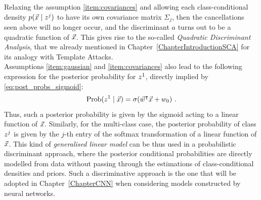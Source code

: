 Relaxing the assumption \ref{item:covariances} and allowing each class-conditional density $p(\vec{x}\mid z^j)$ to have its own covariance matrix $\Sigma_j$, then the cancellations seen above will no longer occur, and the discriminant $a$ turns out to be a quadratic function of $\vec{x}$. This gives rise to the so-called \emph{Quadratic Discriminant Analysis}, that we already mentioned in Chapter~\ref{ChapterIntroductionSCA} for its analogy with Template Attacks.\\

Assumptions \ref{item:gaussian} and \ref{item:covariances} also lead to the following expression for the posterior probability for $z^1$, directly implied by \eqref{eq:post_probs_sigmoid}: 
\begin{equation}
\prob(\given{\sensVar^1}{\vLeakVec}) = \sigma(\www^\intercal \vLeakVec + w_0)\mbox{ .}
\end{equation}
Thus, such a posterior probability is given by the sigmoid acting to a linear function of $\vec{x}$. Similarly, for the multi-class case, the posterior probability of class $z^j$ is given by the $j$-th entry of the softmax transformation of a linear function of $\vec{x}$. This kind of \emph{generalised linear model} can be thus used in a probabilistic discriminant approach, where the posterior conditional probabilities are directly modelled from data without passing through the estimations of class-conditional densities and priors. Such a discriminative approach is the one that will be adopted in Chapter~\ref{ChapterCNN} when considering models constructed by neural networks.






